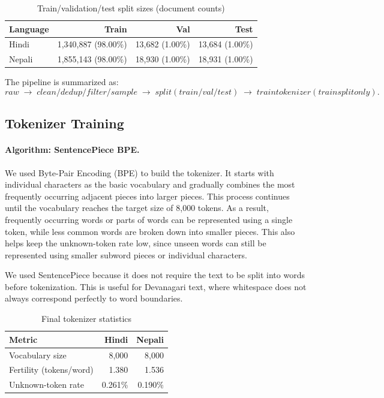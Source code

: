 \documentclass[10pt,a4paper]{article}
\begin{document}
\begin{table}[H]\centering
\caption{Train/validation/test split sizes (document counts)}
\small
\begin{tabular}{lrrr}\toprule
Language & Train & Val & Test \\\midrule
Hindi & 1,340,887 (98.00\%) & 13,682 (1.00\%) & 13,684 (1.00\%)\\
Nepali & 1,855,143 (98.00\%) & 18,930 (1.00\%) & 18,931 (1.00\%)\\
\bottomrule\end{tabular}
\end{table}

The pipeline is summarized as:
\[
{raw} \;\rightarrow\; {clean/dedup/filter/sample}
\;\rightarrow\; {split (train/val/test)}
\;\rightarrow\; {train  tokenizer (train  split  only)}.
\]

\subsection{Tokenizer Training}
\paragraph{Algorithm: SentencePiece BPE.}
We used Byte-Pair Encoding (BPE) to build the tokenizer. It starts with
individual characters as the basic vocabulary and gradually combines the
most frequently occurring adjacent pieces into larger pieces. This process
continues until the vocabulary reaches the target size of 8,000 tokens.
As a result, frequently occurring words or parts of words can be represented
using a single token, while less common words are broken down into smaller
pieces. This also helps keep the unknown-token rate low, since unseen words
can still be represented using smaller subword pieces or individual
characters.

We used SentencePiece because it does not require the text to be split into
words before tokenization. This is useful for Devanagari text, where
whitespace does not always correspond perfectly to word boundaries.

\begin{table}[H]\centering
\caption{Final tokenizer statistics}
\small
\begin{tabular}{lrr}\toprule
Metric & Hindi & Nepali\\\midrule
Vocabulary size & 8,000 & 8,000\\
Fertility (tokens/word) & 1.380 & 1.536\\
Unknown-token rate & 0.261\% & 0.190\%\\
\bottomrule\end{tabular}
\end{table}
\end{document}

